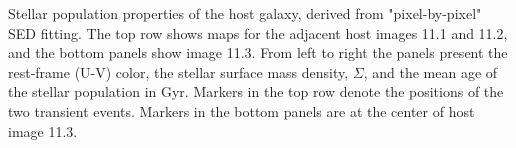 \label{fig:HostProperties}
Stellar population properties of the \spock host galaxy, derived from
"pixel-by-pixel" SED fitting.  The top row shows maps for the adjacent
host images 11.1 and 11.2, and the bottom panels show image 11.3.
From left to right the panels present the rest-frame (U-V) color, the
stellar surface mass density, $\Sigma$, and the mean age of the
stellar population in Gyr.  Markers in the top row denote the
positions of the two \spock transient events. Markers in the bottom
panels are at the center of host image 11.3.
